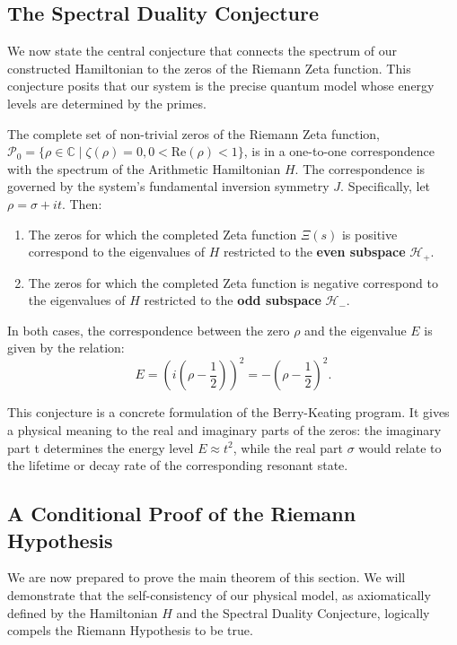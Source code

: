 \subsection{The Spectral Duality Conjecture}
We now state the central conjecture that connects the spectrum of our constructed Hamiltonian to the zeros of the Riemann Zeta function. This conjecture posits that our system is the precise quantum model whose energy levels are determined by the primes.

\begin{conjecture}
\label{conj:spectral_duality}
The complete set of non-trivial zeros of the Riemann Zeta function, $\mathcal{P}_0 = \{ \rho \in \mathbb{C} \mid \zeta(\rho)=0, 0 < \mathrm{Re}(\rho) < 1 \}$, is in a one-to-one correspondence with the spectrum of the Arithmetic Hamiltonian $H$. The correspondence is governed by the system's fundamental inversion symmetry $J$.
Specifically, let $\rho = \sigma + it$. Then:
\begin{enumerate}
    \item The zeros for which the completed Zeta function $\Xi(s)$ is positive correspond to the eigenvalues of $H$ restricted to the \textbf{even subspace} $\mathcal{H}_+$.
    \item The zeros for which the completed Zeta function is negative correspond to the eigenvalues of $H$ restricted to the \textbf{odd subspace} $\mathcal{H}_-$.
\end{enumerate}
In both cases, the correspondence between the zero $\rho$ and the eigenvalue $E$ is given by the relation:
\begin{equation}
    E = \left(i\left(\rho - \frac{1}{2}\right)\right)^2 = -\left(\rho - \frac{1}{2}\right)^2.
\end{equation}
\end{conjecture}
\begin{remark}
This conjecture is a concrete formulation of the Berry-Keating program. It gives a physical meaning to the real and imaginary parts of the zeros: the imaginary part t determines the energy level $E \approx t^2$, while the real part $\sigma$ would relate to the lifetime or decay rate of the corresponding resonant state.
\end{remark}

\subsection{A Conditional Proof of the Riemann Hypothesis}
We are now prepared to prove the main theorem of this section. We will demonstrate that the self-consistency of our physical model, as axiomatically defined by the Hamiltonian $H$ and the Spectral Duality Conjecture, logically compels the Riemann Hypothesis to be true.

